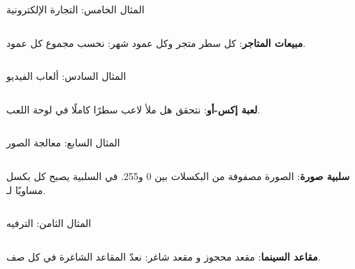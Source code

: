 \begin{frame}[t]{المثال الخامس: التجارة الإلكترونية}
    \begin{columns}[T]
        {\small\textbf{مبيعات المتاجر}: كل سطر متجر وكل عمود شهر: نحسب مجموع كل عمود.\par}
        \vspace{0.3cm}
    \end{columns}
\end{frame}

\begin{frame}[t]{المثال السادس: ألعاب الفيديو}
    \begin{columns}[T]
        {\small\textbf{لعبة إكس-أو}: نتحقق هل ملأ لاعب سطرًا كاملًا في لوحة اللعب.\par}
        \vspace{0.3cm}
    \end{columns}
\end{frame}

\begin{frame}[t]{المثال السابع: معالجة الصور}
    \begin{columns}[T]
        {\small\textbf{سلبية صورة}: الصورة مصفوفة من البكسلات بين 0 و255. في السلبية يصبح كل بكسل  مساويًا لـ.\par}
        \vspace{0.3cm}
    \end{columns}
\end{frame}

\begin{frame}[t]{المثال الثامن: الترفيه}
    \begin{columns}[T]
        {\small\textbf{مقاعد السينما}:  مقعد محجوز و مقعد شاغر: نعدّ المقاعد الشاغرة في كل صف.\par}
        \vspace{0.3cm}
    \end{columns}
\end{frame}

